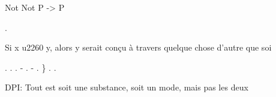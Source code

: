\documentclass[10pt]{report}
\begin{document}
\begin{coqdoccode}
\begin{coqdoccomment}
Not\coqdocindent{0.50em}
Not\coqdocindent{0.50em}
P\coqdocindent{0.50em}
->\coqdocindent{0.50em}
P\coqdocindent{0.50em}
\end{coqdoccomment}
\coqdoceol
\coqdocindent{2.00em}
 .\coqdoceol
\coqdocindent{2.00em}
\begin{coqdoccomment}
\coqdocindent{0.50em}
Si\coqdocindent{0.50em}
x\coqdocindent{0.50em}
u2260\coqdocindent{0.50em}
y,\coqdocindent{0.50em}
alors\coqdocindent{0.50em}
y\coqdocindent{0.50em}
serait\coqdocindent{0.50em}
conçu\coqdocindent{0.50em}
à\coqdocindent{0.50em}
travers\coqdocindent{0.50em}
quelque\coqdocindent{0.50em}
chose\coqdocindent{0.50em}
d'autre\coqdocindent{0.50em}
que\coqdocindent{0.50em}
soi\coqdocindent{0.50em}
\end{coqdoccomment}
\coqdoceol
\coqdocindent{2.00em}
 .\coqdoceol
\coqdocindent{2.00em}
\coqdoctac{\ensuremath{\exists}} .\coqdoceol
\coqdocindent{2.00em}
.\coqdoceol
\coqdocindent{2.00em}
-  .\coqdoceol
\coqdocindent{2.00em}
-  .\coqdoceol
\coqdocindent{1.00em}
\}\coqdoceol
\coqdocindent{1.00em}
 .\coqdoceol
\coqdocnoindent
{}.\coqdoceol
\coqdocemptyline
\end{coqdoccode}
DPI: Tout est soit une substance, soit un mode, mais pas les deux 
\end{document}
